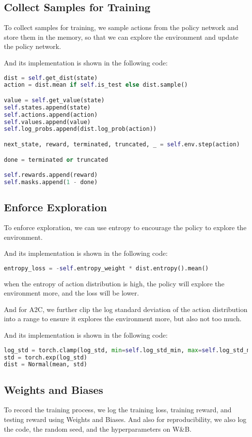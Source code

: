 \subsection{Collect Samples for Training}
To collect samples for training, we sample actions from the policy network and store them in the memory, so that we can explore the environment and update the policy network.

And its implementation is shown in the following code:
\begin{lstlisting}[language=Python]
dist = self.get_dist(state)
action = dist.mean if self.is_test else dist.sample()

value = self.get_value(state)
self.states.append(state)
self.actions.append(action)
self.values.append(value)
self.log_probs.append(dist.log_prob(action))

next_state, reward, terminated, truncated, _ = self.env.step(action)

done = terminated or truncated

self.rewards.append(reward)
self.masks.append(1 - done)
\end{lstlisting}

\subsection{Enforce Exploration}
To enforce exploration, we can use entropy to encourage the policy to explore the environment.

And its implementation is shown in the following code:
\begin{lstlisting}[language=Python]
entropy_loss = -self.entropy_weight * dist.entropy().mean()
\end{lstlisting}
when the entropy of action distribution is high, the policy will explore the environment more, and the loss will be lower.

And for A2C, we further clip the log standard deviation of the action distribution into a range to ensure it explores the environment more, but also not too much.

And its implementation is shown in the following code:
\begin{lstlisting}[language=Python]
log_std = torch.clamp(log_std, min=self.log_std_min, max=self.log_std_max)
std = torch.exp(log_std)
dist = Normal(mean, std)
\end{lstlisting}


\subsection{Weights and Biases}
To record the training process, we log the training loss, training reward, and testing reward using Weights and Biases.
And also for reproducibility, we also log the code, the random seed, and the hyperparameters on W\&B.

